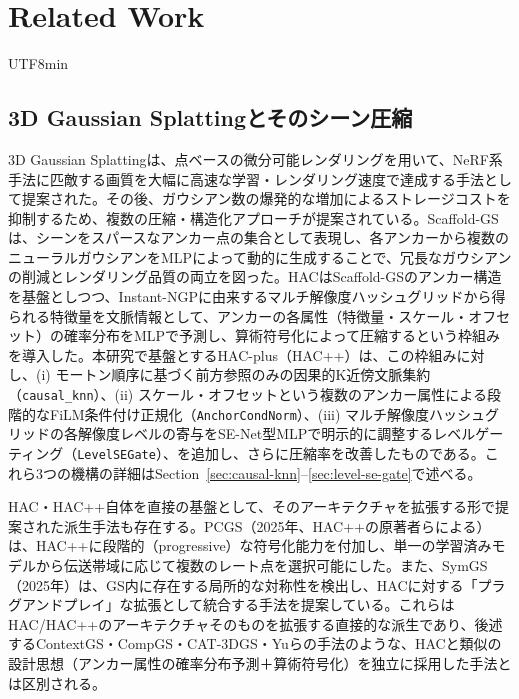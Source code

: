 \documentclass{ieeeaccess}
\begin{document}
\section{Related Work}
\begin{CJK}{UTF8}{min}

\subsection{3D Gaussian Splattingとそのシーン圧縮}
3D Gaussian Splatting\cite{kerbl20233d}は、点ベースの微分可能レンダリングを用いて、NeRF系手法に匹敵する画質を大幅に高速な学習・レンダリング速度で達成する手法として提案された。その後、ガウシアン数の爆発的な増加によるストレージコストを抑制するため、複数の圧縮・構造化アプローチが提案されている。Scaffold-GS\cite{lu2024scaffold}は、シーンをスパースなアンカー点の集合として表現し、各アンカーから複数のニューラルガウシアンをMLPによって動的に生成することで、冗長なガウシアンの削減とレンダリング品質の両立を図った。HAC\cite{chen2024hac}はScaffold-GSのアンカー構造を基盤としつつ、Instant-NGP\cite{muller2022instant}に由来するマルチ解像度ハッシュグリッドから得られる特徴量を文脈情報として、アンカーの各属性（特徴量・スケール・オフセット）の確率分布をMLPで予測し、算術符号化によって圧縮するという枠組みを導入した。本研究で基盤とするHAC-plus（HAC++\cite{chen2025hacpp}）は、この枠組みに対し、(i) モートン順序に基づく前方参照のみの因果的K近傍文脈集約（\texttt{causal\_knn}）、(ii) スケール・オフセットという複数のアンカー属性による段階的なFiLM条件付け正規化（\texttt{AnchorCondNorm}）、(iii) マルチ解像度ハッシュグリッドの各解像度レベルの寄与をSE-Net型MLPで明示的に調整するレベルゲーティング（\texttt{LevelSEGate}）、を追加し、さらに圧縮率を改善したものである。これら3つの機構の詳細はSection~\ref{sec:causal-knn}--\ref{sec:level-se-gate}で述べる。

HAC・HAC++自体を直接の基盤として、そのアーキテクチャを拡張する形で提案された派生手法も存在する。PCGS\cite{chen2025pcgs}（2025年、HAC++の原著者らによる）は、HAC++に段階的（progressive）な符号化能力を付加し、単一の学習済みモデルから伝送帯域に応じて複数のレート点を選択可能にした。また、SymGS\cite{gupta2025symgs}（2025年）は、GS内に存在する局所的な対称性を検出し、HACに対する「プラグアンドプレイ」な拡張として統合する手法を提案している。これらはHAC/HAC++のアーキテクチャそのものを拡張する直接的な派生であり、後述するContextGS・CompGS・CAT-3DGS・Yuらの手法のような、HACと類似の設計思想（アンカー属性の確率分布予測＋算術符号化）を独立に採用した手法とは区別される。


\end{CJK}
\end{document}
